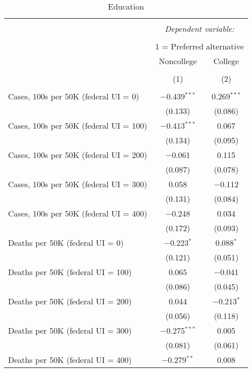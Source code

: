 
\begin{table}[!htbp] \centering \scriptsize 
  \caption{Education} 
  \label{} 
\begin{tabular}{@{\extracolsep{5pt}}lcc} 
\\[-1.8ex]\hline 
\hline \\[-1.8ex] 
 & \multicolumn{2}{c}{\textit{Dependent variable:}} \\ 
\cline{2-3} 
\\[-1.8ex] & \multicolumn{2}{c}{1 = Preferred alternative} \\ 
 & Noncollege & College \\ 
\\[-1.8ex] & (1) & (2)\\ 
\hline \\[-1.8ex] 
 Cases, 100s per 50K (federal UI = 0) & $-$0.439$^{***}$ & 0.269$^{***}$ \\ 
  & (0.133) & (0.086) \\ 
  Cases, 100s per 50K (federal UI = 100) & $-$0.413$^{***}$ & 0.067 \\ 
  & (0.134) & (0.095) \\ 
  Cases, 100s per 50K (federal UI = 200) & $-$0.061 & 0.115 \\ 
  & (0.087) & (0.078) \\ 
  Cases, 100s per 50K (federal UI = 300) & 0.058 & $-$0.112 \\ 
  & (0.131) & (0.084) \\ 
  Cases, 100s per 50K (federal UI = 400) & $-$0.248 & 0.034 \\ 
  & (0.172) & (0.093) \\ 
  Deaths per 50K (federal UI = 0) & $-$0.223$^{*}$ & 0.088$^{*}$ \\ 
  & (0.121) & (0.051) \\ 
  Deaths per 50K (federal UI = 100) & 0.065 & $-$0.041 \\ 
  & (0.086) & (0.045) \\ 
  Deaths per 50K (federal UI = 200) & 0.044 & $-$0.213$^{*}$ \\ 
  & (0.056) & (0.118) \\ 
  Deaths per 50K (federal UI = 300) & $-$0.275$^{***}$ & 0.005 \\ 
  & (0.081) & (0.061) \\ 
  Deaths per 50K (federal UI = 400) & $-$0.279$^{**}$ & 0.008 \\ 

\end{tabular}
\end{table}
